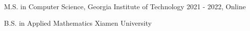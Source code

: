


\begin{cventries}




	\verycompactcventry
	{M.S. in Computer Science, Georgia Institute of Technology} %
	{2021 - 2022, Online} %

	\verycompactcventry
	{B.S. in Applied Mathematics} %
	{Xiamen University} %

\end{cventries}